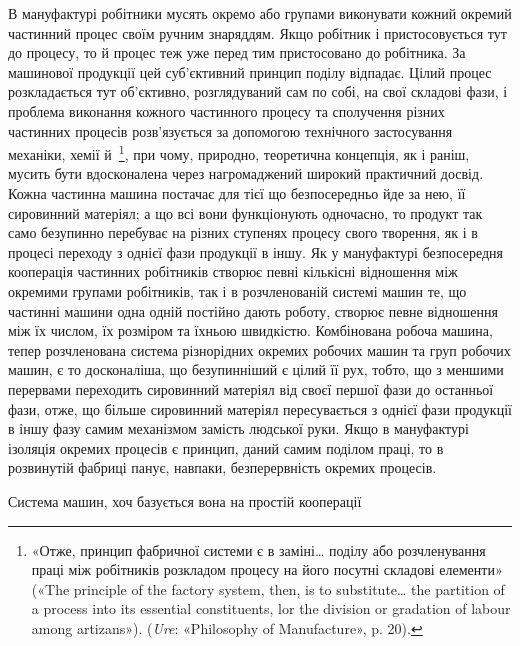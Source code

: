 В мануфактурі робітники мусять окремо або групами виконувати
кожний окремий частинний процес своїм ручним знаряддям.
Якщо робітник і пристосовується тут до процесу, то й процес
теж уже перед тим пристосовано до робітника. За машинової
продукції цей суб’єктивний принцип поділу відпадає. Цілий
процес розкладається тут об’єктивно, розглядуваний сам по собі,
на свої складові фази, і проблема виконання кожного частинного
процесу та сполучення різних частинних процесів розв’язується
за допомогою технічного застосування механіки, хемії й~\footnote{
«Отже, принцип фабричної системи є в заміні\dots{} поділу або розчленування
праці між робітників розкладом процесу на його посутні
складові елементи» («The principle of the factory system, then, is to substitute\dots{}
the partition of a process into its essential constituents, lor the
division or gradation of labour among artizans»). (\emph{Ure}: «Philosophy of
Manufacture», p. 20).
},
при чому, природно, теоретична концепція, як і раніш, мусить
бути вдосконалена через нагромаджений широкий практичний
досвід. Кожна частинна машина постачає для тієї що безпосередньо
йде за нею, її сировинний матеріял; а що всі вони функціонують
одночасно, то продукт так само безупинно перебуває на
різних ступенях процесу свого творення, як і в процесі переходу
з однієї фази продукції в іншу. Як у мануфактурі безпосередня
кооперація частинних робітників створює певні кількісні відношення
між окремими групами робітників, так і в розчленованій
системі машин те, що частинні машини одна одній постійно дають
роботу, створює певне відношення між їх числом, їх розміром
та їхньою швидкістю. Комбінована робоча машина, тепер розчленована
система різнорідних окремих робочих машин та груп
робочих машин, є то досконаліша, що безупинніший є цілий її
рух, тобто, що з меншими перервами переходить сировинний матеріял
від своєї першої фази до останньої фази, отже, що більше
сировинний матеріял пересувається з однієї фази продукції в
іншу фазу самим механізмом замість людської руки. Якщо в
мануфактурі ізоляція окремих процесів є принцип, даний самим
поділом праці, то в розвинутій фабриці панує, навпаки, безперервність
окремих процесів.

Система машин, хоч базується вона на простій кооперації
\parbreak{}  %

